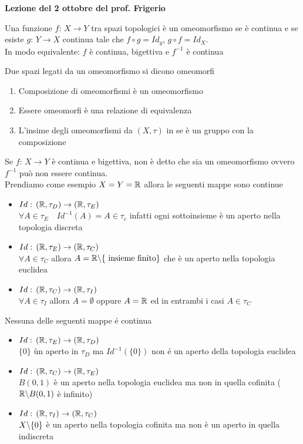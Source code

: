 


\textbf{Lezione del 2 ottobre del prof. Frigerio}
\begin{defn}[Omeomorfismo]\bianco
  Una funzione $f:\, X \to Y$ tra spazi topologici \`e un omeomorfismo se \`e continua e se esiste $g:\, Y \to X $ continua tale che $f\circ g =Id_y$, $ g\circ f=Id_X$.\\
  In modo equivalente: $f$ \`e continua, bigettiva e $f^{-1}$ \`e continua
 \end{defn}
 \spazio
 \begin{defn}
  Due spazi legati da un omeomorfismo si dicono omeomorfi
 \end{defn}

\begin{oss} \bbianco
\begin{enumerate}
 \item Composizione di omeomorfismi \`e un omeomorfismo
 \item Essere omeomorfi \`e una relazione di equivalenza
 \item L'insime degli omeomorfismi da $(X,\tau)$ in se \`e un gruppo con la composizione
 \end{enumerate}

\end{oss}
\begin{oss}
Se $f:\, X \to Y$ \`e continua e bigettiva, non \`e detto che sia un omeomorfismo ovvero $f^{-1}$ pu\`o non essere continua.\\
 Prendiamo come esempio $X=Y=\mathbb{R}$  allora le seguenti mappe sono continue 
  \begin{itemize}
   \item $ Id:\, ( \mathbb{R}, \tau_D ) \to (\mathbb{R},\tau_E)$ \\
   $\forall A \in \tau_E \quad Id^{-1}(A)=A \in \tau_c$ infatti ogni sottoinsieme \`e un aperto nella topologia discreta
   \item $Id:\, ( \mathbb{R}, \tau_E ) \to (\mathbb{R},\tau_C)$ \\
   $\forall A \in \tau_C $  allora  $A=\mathbb{R}\backslash \{ \text{ insieme finito} \}$ che \`e un aperto nella topologia euclidea
   \item $Id:\, ( \mathbb{R}, \tau_C ) \to (\mathbb{R},\tau_I) $ \\
   $\forall A \in \tau_I$ allora $A=\emptyset$ oppure $A=\mathbb{R}$ ed in entrambi i casi $A\in \tau_C$
  \end{itemize}
Nessuna delle seguenti mappe \'e continua
\begin{itemize}
   \item $ Id:\, ( \mathbb{R}, \tau_E ) \to (\mathbb{R},\tau_D)$ \\
   $\{ 0\} $ \` un aperto in $\tau_D$ ma $Id^{-1}(\{ 0\})$ non \'e un aperto della topologia euclidea
   \item $Id:\, ( \mathbb{R}, \tau_C ) \to (\mathbb{R},\tau_E)$ \\
   $B(0,1)$ \`e un aperto nella topologia euclidea ma non in quella cofinita ($\mathbb{R}\backslash B(0,1)$ \`e infinito)
   \item $Id:\, ( \mathbb{R}, \tau_I) \to (\mathbb{R},\tau_C) $ \\
   $X\backslash\{0\}$ \`e un aperto nella topologia cofinita ma non \`e un aperto in quella indiscreta
  \end{itemize}
\end{oss}
\newpage
